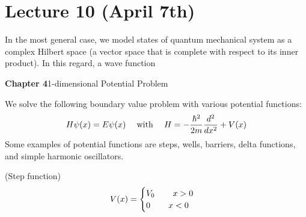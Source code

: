 \section{Lecture 10 (April 7th)}
\begin{recall}
In the most general case, we model states of quantum mechanical system as a complex Hilbert space (a vector space that is complete with respect to its inner product). In this regard, a wave function 
\end{recall}
\vspace{2ex}
{\bf Chapter 4}\hspace{2ex}1-dimensional Potential Problem
\\
\begin{rmk}
We solve the following boundary value problem with various potential functions:
\[
H\psi (x)=E\psi (x)
\hspace{3ex}\mathrm{with}\hspace{3ex}H=-\dfrac{\hbar ^2}{2m}\dfrac{d ^2}{dx^2}+V(x)\\ \]
Some examples of potential functions are steps, wells, barriers, delta functions, and simple harmonic oscillators.
\end{rmk}
\vspace{2ex}
\begin{thm}
(Step function) 
\[V(x)=\begin{cases}
V_0\hspace{5ex}x>0\\
0\hspace{5ex}x<0
\end{cases}\]
\end{thm}
\vspace{2ex}
